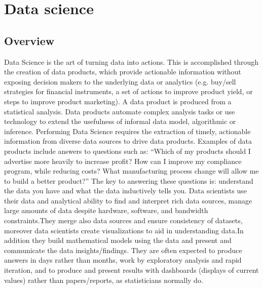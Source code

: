 \documentclass[a4paper,12pt,oneside]{report}
\begin{document}
\section{Data science}
\subsection{Overview}
{  Data Science is the art of turning data into actions. This is accomplished through the creation of data products, which provide actionable information without exposing decision makers to the underlying data or analytics (e.g. buy/sell strategies for financial instruments, a set of actions to improve product yield, or steps to improve product marketing). A data product is produced from a statistical analysis. Data products automate complex analysis tasks or use technology to extend the usefulness of informal data model, algorithmic or inference.
Performing Data Science requires the extraction of timely, actionable information from diverse data sources to drive data products.
Examples of data products include answers to questions such as:
“Which of my products should I advertise more heavily to increase profit? How can I improve my compliance program, while reducing costs? What manufacturing process change will allow me to build a better product?” The key to answering these questions is: understand the data you have and what the data inductively tells you.
Data scientists use their data and analytical ability to find and interpret rich data sources, manage large amounts of data despite hardware, software, and bandwidth constraints.They merge also data sources and ensure consistency of datasets, moreover data scientists  create visualizations to aid in understanding data.In addition they build mathematical models using the data and present and communicate the data insights/findings. They are often expected to produce answers in days rather than months, work by exploratory analysis and rapid iteration, and to produce and present results with dashboards (displays of current values) rather than papers/reports, as statisticians normally do.}
\end{document}
